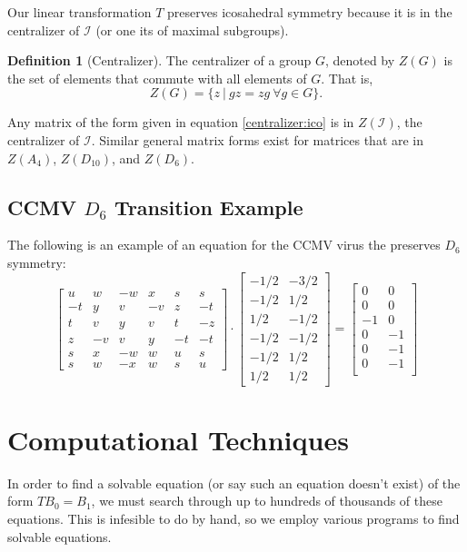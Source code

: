 \documentclass[a4paper,10pt]{article}
\theoremstyle{plain}
\theoremstyle{definition}
\newtheorem{Definition}[Theorem]{Definition}
\theoremstyle{remark}
\begin{document}
Our linear transformation \(T\) preserves icosahedral symmetry because it is in the centralizer of \(\mathcal{I}\) (or one its of maximal subgroups).
\begin{Definition}[Centralizer]
    The centralizer of a group \(G\), denoted by \(Z(G)\) is the set of elements that commute with all elements of \(G\).
    That is, \[Z(G) = \{z\ |\ gz = zg\ \forall g \in G\}.\]
\end{Definition}
Any matrix of the form given in equation \ref{centralizer:ico} is in \(Z(\mathcal{I})\), the centralizer of \(\mathcal{I}\).
Similar general matrix forms exist for matrices that are in \(Z(A_4)\), \(Z(D_{10})\), and \(Z(D_6)\).

\subsection{CCMV \(D_6\) Transition Example}
The following is an example of an equation for the CCMV virus the preserves \(D_6\) symmetry:
\[\begin{bmatrix}
    u  & w  & -w & x  & s  & s  \\
    -t & y  & v  & -v & z  & -t \\
    t  & v  & y  & v  & t  & -z \\
    z  & -v & v  & y  & -t & -t \\
    s  & x  & -w & w  & u  & s  \\
    s  & w  & -x & w  & s  & u 
\end{bmatrix}
\cdot
\begin{bmatrix}
-1/2 & -3/2 \\
-1/2 & 1/2 \\
1/2 & -1/2 \\
-1/2 & -1/2 \\
-1/2 & 1/2 \\
1/2 & 1/2
\end{bmatrix} 
=
\begin{bmatrix}
0 & 0 \\
0 & 0 \\
-1 & 0 \\
0 & -1 \\
0 & -1 \\
0 & -1 \\
\end{bmatrix}\]

\section{Computational Techniques}
In order to find a solvable equation (or say such an equation doesn't exist) of the form \(TB_0 = B_1\), we must search through up to hundreds of thousands of these equations.
This is infesible to do by hand, so we employ various programs to find solvable equations.
\end{document}
